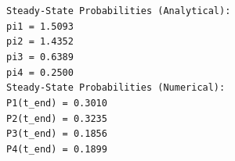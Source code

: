 \documentclass[a4paper,12pt]{article}
\begin{document}
\texttt{Steady-State Probabilities (Analytical):}\\
\texttt{pi1 = 1.5093}\\
\texttt{pi2 = 1.4352}\\
\texttt{pi3 = 0.6389}\\
\texttt{pi4 = 0.2500}\\

\texttt{Steady-State Probabilities (Numerical):}\\
\texttt{P1(t\_end) = 0.3010}\\
\texttt{P2(t\_end) = 0.3235}\\
\texttt{P3(t\_end) = 0.1856}\\
\texttt{P4(t\_end) = 0.1899}
\end{document}
